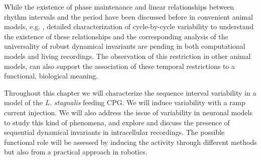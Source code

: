 While the existence of phase maintenance and linear relationships between rhythm intervals and the period have been discussed before in convenient animal models, e.g. \cite{grillner_generation_1976,hooper_phase_1997,vavoulis_dynamic_2007}, detailed characterization of cycle-by-cycle variability to understand the existence of these relationships and the corresponding analysis of the universality of robust dynamical invariants are pending in both computational models and living recordings. The observation of this restriction in other animal models, can also support the association of these temporal restrictions to a functional, biological meaning.

Throughout this chapter we will characterize the sequence interval variability in a model of the \textit{L. stagnalis} feeding CPG. We will induce variability with a ramp current injection. We will also address the issue of variability in neuronal models to study this kind of phenomena, and explore and discuss the presence of sequential dynamical invariants in intracellular recordings. The possible functional role will be assessed by inducing the activity through different methods but also from a practical approach in robotics. 


